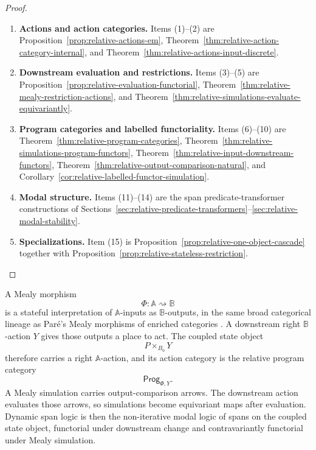 \begin{proof}
\leavevmode
\begin{enumerate}
\item \textbf{Actions and action categories.}
Items (1)--(2) are
Proposition~\ref{prop:relative-actions-em},
Theorem~\ref{thm:relative-action-category-internal}, and
Theorem~\ref{thm:relative-actions-input-discrete}.

\item \textbf{Downstream evaluation and restrictions.}
Items (3)--(5) are
Proposition~\ref{prop:relative-evaluation-functorial},
Theorem~\ref{thm:relative-mealy-restriction-actions}, and
Theorem~\ref{thm:relative-simulations-evaluate-equivariantly}.

\item \textbf{Program categories and labelled functoriality.}
Items (6)--(10) are
Theorem~\ref{thm:relative-program-categories},
Theorem~\ref{thm:relative-simulations-program-functors},
Theorem~\ref{thm:relative-input-downstream-functors},
Theorem~\ref{thm:relative-output-comparison-natural}, and
Corollary~\ref{cor:relative-labelled-functor-simulation}.

\item \textbf{Modal structure.}
Items (11)--(14) are the span predicate-transformer constructions of
Sections~\ref{sec:relative-predicate-transformers}--\ref{sec:relative-modal-stability}.

\item \textbf{Specializations.}
Item (15) is
Proposition~\ref{prop:relative-one-object-cascade} together with
Proposition~\ref{prop:relative-stateless-restriction}.
\end{enumerate}
\end{proof}

\begin{remark}
\label{rem:relative-final-summary}
A Mealy morphism
\[
\Phi:\mathbb A\rightsquigarrow\mathbb B
\]
is a stateful interpretation of \(\mathbb A\)-inputs as
\(\mathbb B\)-outputs, in the same broad categorical lineage as Paré's Mealy
morphisms of enriched categories \cite{PareMealyMorphisms}. A downstream right
\(\mathbb B\)-action \(Y\) gives those outputs a place to act. The coupled
state object
\[
P\times_{B_0}Y
\]
therefore carries a right \(\mathbb A\)-action, and its action category is the
relative program category
\[
\mathsf{Prog}_{\Phi,Y}.
\]
A Mealy simulation carries output-comparison arrows. The downstream action
evaluates those arrows, so simulations become equivariant maps after
evaluation. Dynamic span logic is then the non-iterative modal logic of spans
on the coupled state object, functorial under downstream change and
contravariantly functorial under Mealy simulation.
\end{remark}